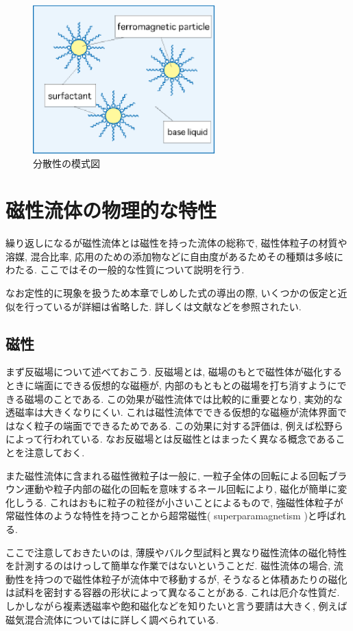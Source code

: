 \documentclass[b5,twocolumn,11pt]{jarticle}
\begin{document}
\begin{figure}
\begin{center}
\includegraphics[width=70mm]{No17_sd.eps}
\end{center}
\caption{分散性の模式図}
\label{fig:sd}
\end{figure}

\section{磁性流体の物理的な特性}
繰り返しになるが磁性流体とは磁性を持った流体の総称で, 磁性体粒子の材質や溶媒, 混合比率, 応用のための添加物などに自由度があるためその種類は多岐にわたる. ここではその一般的な性質について説明を行う. \par
なお定性的に現象を扱うため本章でしめした式の導出の際, いくつかの仮定と近似を行っているが詳細は省略した. 詳しくは文献\cite{No7_磁性流体}\cite{No7_MF}などを参照されたい. 

  \subsection{磁性}
まず反磁場について述べておこう. 反磁場とは, 磁場のもとで磁性体が磁化するときに端面にできる仮想的な磁極が, 内部のもともとの磁場を打ち消すようにできる磁場のことである. この効果が磁性流体では比較的に重要となり, 実効的な透磁率は大きくなりにくい. これは磁性流体でできる仮想的な磁極が流体界面ではなく粒子の端面でできるためである. この効果に対する評価は, 例えば松野ら\cite{No7_反磁場}によって行われている. なお反磁場とは反磁性とはまったく異なる概念であることを注意しておく. \par
また磁性流体に含まれる磁性微粒子は一般に, 一粒子全体の回転による回転ブラウン運動や粒子内部の磁化の回転を意味するネール回転により, 磁化が簡単に変化しうる. これはおもに粒子の粒径が小さいことによるもので, 強磁性体粒子が常磁性体のような特性を持つことから超常磁性( superparamagnetism )と呼ばれる. \par
ここで注意しておきたいのは, 薄膜やバルク型試料と異なり磁性流体の磁化特性を計測するのはけっして簡単な作業ではないということだ. 磁性流体の場合, 流動性を持つので磁性体粒子が流体中で移動するが, そうなると体積あたりの磁化は試料を密封する容器の形状によって異なることがある. これは厄介な性質だ. しかしながら複素透磁率や飽和磁化などを知りたいと言う要請は大きく, 例えば磁気混合流体については\cite{No7_MCF磁気特性}に詳しく調べられている. 
\end{document}
